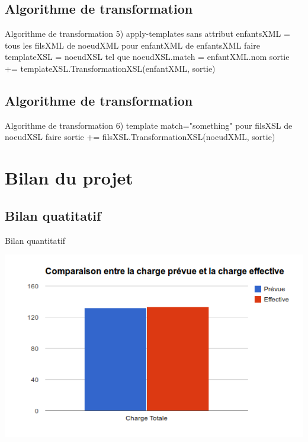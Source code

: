 \documentclass[aspectratio=169]{beamer}
\begin{document}
\subsection{Algorithme de transformation}
\begin{frame}{Algorithme de transformation}
 5) apply-templates sans attribut
enfantsXML = tous les filsXML de noeudXML
pour enfantXML de enfantsXML faire
    templateXSL = noeudXSL tel que noeudXSL.match = enfantXML.nom
    sortie += templateXSL.TransformationXSL(enfantXML, sortie)
\end{frame}

\subsection{Algorithme de transformation}
\begin{frame}{Algorithme de transformation}
 6) template match="something"
pour filsXSL de noeudXSL faire
    sortie += filsXSL.TransformationXSL(noeudXML, sortie)
\end{frame}

\section{Bilan du projet}
\subsection{Bilan quatitatif}
\begin{frame}{Bilan quantitatif}
\begin{center}
 \includegraphics[scale=0.5]{chargetot}
\end{center}
\end{frame}
\end{document}
